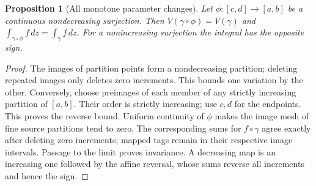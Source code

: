 \documentclass[11pt,a4paper,openany]{book}
\newtheorem{proposition}[theorem]{Proposition}
\theoremstyle{definition}
\theoremstyle{remark}\newtheorem{remark}[theorem]{Remark}
\newcommand{\dd}{\,d}\newcommand{\iu}{\mathrm i}
\begin{document}
\begin{proposition}[All monotone parameter changes]\label{d12:03-06-reparameterization}
Let \(\phi:[c,d]\to[a,b]\) be a continuous nondecreasing surjection.
Then \(V(\gamma\circ\phi)=V(\gamma)\) and
\(\int_{\gamma\circ\phi}f\dd z=\int_\gamma f\dd z\).
For a nonincreasing surjection the integral has the opposite sign.
\end{proposition}
\begin{proof}
The images of partition points form a nondecreasing partition; deleting
repeated images only deletes zero increments. This bounds one variation
by the other. Conversely, choose preimages of each member of any strictly
increasing partition of \([a,b]\). Their order is strictly increasing;
use \(c,d\) for the endpoints. This proves the reverse bound.
Uniform continuity of \(\phi\) makes the image mesh of fine source
partitions tend to zero. The corresponding sums for \(f\circ\gamma\)
agree exactly after deleting zero increments; mapped tags remain in their
respective image intervals. Passage to the limit proves invariance.
A decreasing map is an increasing one followed by the affine reversal,
whose sums reverse all increments and hence the sign.
\end{proof}
\end{document}
